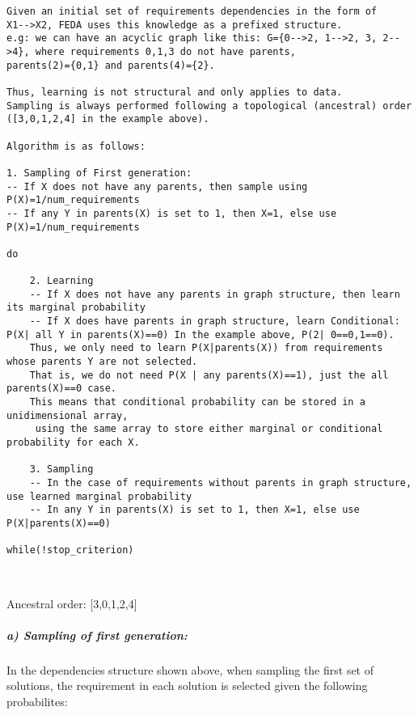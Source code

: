 \documentclass[11pt]{article}
\begin{document}
\begin{verbatim}
Given an initial set of requirements dependencies in the form of
X1-->X2, FEDA uses this knowledge as a prefixed structure.
e.g: we can have an acyclic graph like this: G={0-->2, 1-->2, 3, 2-->4}, where requirements 0,1,3 do not have parents,
parents(2)={0,1} and parents(4)={2}.

Thus, learning is not structural and only applies to data.
Sampling is always performed following a topological (ancestral) order ([3,0,1,2,4] in the example above).

Algorithm is as follows:

1. Sampling of First generation:
-- If X does not have any parents, then sample using  P(X)=1/num_requirements
-- If any Y in parents(X) is set to 1, then X=1, else use P(X)=1/num_requirements

do

    2. Learning
    -- If X does not have any parents in graph structure, then learn its marginal probability
    -- If X does have parents in graph structure, learn Conditional: P(X| all Y in parents(X)==0) In the example above, P(2| 0==0,1==0).
    Thus, we only need to learn P(X|parents(X)) from requirements whose parents Y are not selected.
    That is, we do not need P(X | any parents(X)==1), just the all parents(X)==0 case.
    This means that conditional probability can be stored in a unidimensional array,
     using the same array to store either marginal or conditional probability for each X.

    3. Sampling
    -- In the case of requirements without parents in graph structure, use learned marginal probability
    -- In any Y in parents(X) is set to 1, then X=1, else use P(X|parents(X)==0)

while(!stop_criterion)
\end{verbatim}

    

    \begin{center}
    \end{center}
    { \hspace*{\fill} \\}
    
    Ancestral order: {[}3,0,1,2,4{]}

\subparagraph{a) Sampling of first
generation:}\label{a-sampling-of-first-generation}

In the dependencies structure shown above, when sampling the first set
of solutions, the requirement in each solution is selected given the
following probabilites:
\end{document}
